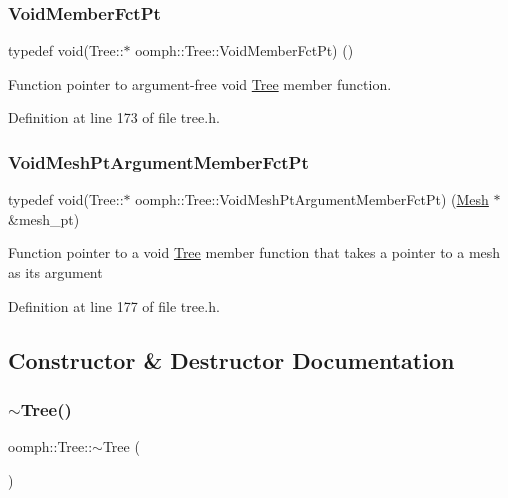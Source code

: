 \subsubsection{\texorpdfstring{Void\+Member\+Fct\+Pt}{VoidMemberFctPt}}
{\footnotesize\ttfamily typedef void(Tree\+::$\ast$  oomph\+::\+Tree\+::\+Void\+Member\+Fct\+Pt) ()}



Function pointer to argument-\/free void \hyperlink{classoomph_1_1Tree}{Tree} member function. 



Definition at line 173 of file tree.\+h.

\mbox{\label{classoomph_1_1Tree_a3e690483c4f28d0a34b24b6ef7eba7f0}} 
\subsubsection{\texorpdfstring{Void\+Mesh\+Pt\+Argument\+Member\+Fct\+Pt}{VoidMeshPtArgumentMemberFctPt}}
{\footnotesize\ttfamily typedef void(Tree\+::$\ast$  oomph\+::\+Tree\+::\+Void\+Mesh\+Pt\+Argument\+Member\+Fct\+Pt) (\hyperlink{classoomph_1_1Mesh}{Mesh} $\ast$\&mesh\+\_\+pt)}

Function pointer to a void \hyperlink{classoomph_1_1Tree}{Tree} member function that takes a pointer to a mesh as its argument 

Definition at line 177 of file tree.\+h.



\subsection{Constructor \& Destructor Documentation}
\mbox{\label{classoomph_1_1Tree_ace0b4169cf94a040c280af8e14f6a283}} 
\subsubsection{\texorpdfstring{$\sim$\+Tree()}{~Tree()}}
{\footnotesize\ttfamily oomph\+::\+Tree\+::$\sim$\+Tree (\begin{DoxyParamCaption}{ }\end{DoxyParamCaption})\hspace{0.3cm}{\ttfamily [virtual]}}



